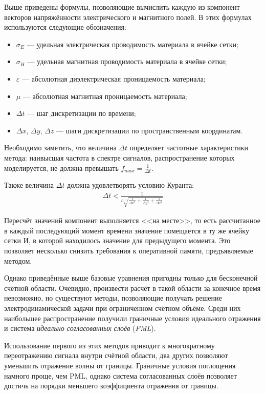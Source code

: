 Выше приведены формулы, позволяющие вычислить каждую из компонент векторов напряжённости электрического и магнитного полей. В этих формулах используются следующие обозначения:
\begin{itemize}[label={}]
\item $ \sigma_E $ --- удельная электрическая проводимость материала в ячейке сетки;
\item $ \sigma_H $ --- удельная магнитная проводимость материала в ячейке сетки;
\item $ \varepsilon $ --- абсолютная диэлектрическая проницаемость материала;
\item $ \mu $ --- абсолютная магнитная проницаемость материала;
\item $ \Delta{t} $ --- шаг дискретизации по времени;
\item $ \Delta{x} $, $ \Delta{y} $, $ \Delta{z} $ --- шаги дискретизации по пространственным координатам.
\end{itemize}

Необходимо заметить, что величина $ \Delta{t} $ определяет частотные характеристики метода: наивысшая частота в спектре сигналов, распространение которых моделируется, не должна превышать $ f_{max} = \frac{1}{\Delta{t}} $.

Также величина $ \Delta{t} $ должна удовлетворять условию Куранта:
\begin{align*}
\Delta{t} < \frac{1}{c\sqrt{\frac{1}{\Delta{x}^2} + \frac{1}{\Delta{y}^2} + \frac{1}{\Delta{z}^2}}}
\end{align*}

Пересчёт значений компонент выполняется <<на месте>>, то есть рассчитанное в каждый последующий момент времени значение помещается в ту же ячейку сетки И, в которой находилось значение для предыдущего момента. Это позволяет несколько снизить требования к оперативной памяти, предъявляемые методом.

Однако приведённые выше базовые уравнения пригодны только для
бесконечной счётной области. Очевидно, произвести расчёт в такой области за конечное время невозможно, но существуют методы,
позволяющие получать решение электродинамической задачи при ограниченном счётном объёме. Среди них наибольшее распространение получили 
граничные условия идеального отражения и система \textit{идеально согласованных слоёв} (\textit{PML}).

Использование первого из этих методов приводит к многократному переотражению
сигнала внутри счётной области, два других позволяют уменьшить отражение волны
от границы. Граничные условия поглощения намного проще, чем PML, однако система
согласованных слоёв позволяет достичь на порядки меньшего
коэффициента отражения от границы.

